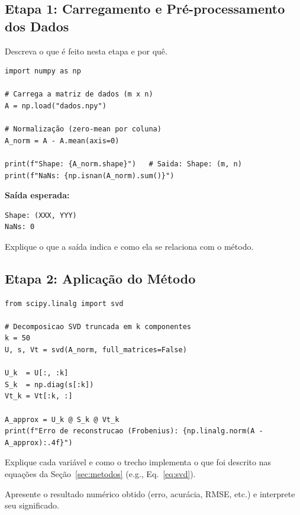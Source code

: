 \documentclass[12pt, a4paper]{article}
\begin{document}

\subsection{Etapa 1: Carregamento e Pré-processamento dos Dados}

Descreva o que é feito nesta etapa e por quê.

\begin{lstlisting}[caption={Carregamento dos dados}, label={lst:load}]
import numpy as np

# Carrega a matriz de dados (m x n)
A = np.load("dados.npy")

# Normalização (zero-mean por coluna)
A_norm = A - A.mean(axis=0)

print(f"Shape: {A_norm.shape}")   # Saida: Shape: (m, n)
print(f"NaNs: {np.isnan(A_norm).sum()}")
\end{lstlisting}

\textbf{Saída esperada:}
\begin{verbatim}
Shape: (XXX, YYY)
NaNs: 0
\end{verbatim}

Explique o que a saída indica e como ela se relaciona com o método.


\subsection{Etapa 2: Aplicação do Método}

\begin{lstlisting}[caption={Decomposição / aplicação do método}, label={lst:method}]
from scipy.linalg import svd

# Decomposicao SVD truncada em k componentes
k = 50
U, s, Vt = svd(A_norm, full_matrices=False)

U_k  = U[:, :k]
S_k  = np.diag(s[:k])
Vt_k = Vt[:k, :]

A_approx = U_k @ S_k @ Vt_k
print(f"Erro de reconstrucao (Frobenius): {np.linalg.norm(A - A_approx):.4f}")
\end{lstlisting}

Explique cada variável e como o trecho implementa o que foi descrito
nas equações da Seção~\ref{sec:metodos} (e.g., Eq.~\ref{eq:svd}).

\begin{resultado}
  Apresente o resultado numérico obtido (erro, acurácia, RMSE, etc.)
  e interprete seu significado.
\end{resultado}
\end{document}
